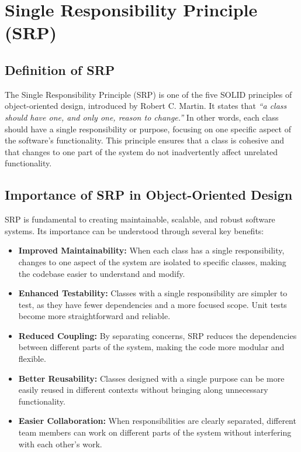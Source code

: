 
\section{Single Responsibility Principle (SRP)}

\subsection{Definition of SRP}

The Single Responsibility Principle (SRP) is one of the five SOLID principles of object-oriented design, introduced by Robert C. Martin. It states that \textit{``a class should have one, and only one, reason to change.''} In other words, each class should have a single responsibility or purpose, focusing on one specific aspect of the software's functionality. This principle ensures that a class is cohesive and that changes to one part of the system do not inadvertently affect unrelated functionality.

\subsection{Importance of SRP in Object-Oriented Design}

SRP is fundamental to creating maintainable, scalable, and robust software systems. Its importance can be understood through several key benefits:

\begin{itemize}
    \item \textbf{Improved Maintainability:} When each class has a single responsibility, changes to one aspect of the system are isolated to specific classes, making the codebase easier to understand and modify.
    
    \item \textbf{Enhanced Testability:} Classes with a single responsibility are simpler to test, as they have fewer dependencies and a more focused scope. Unit tests become more straightforward and reliable.
    
    \item \textbf{Reduced Coupling:} By separating concerns, SRP reduces the dependencies between different parts of the system, making the code more modular and flexible.
    
    \item \textbf{Better Reusability:} Classes designed with a single purpose can be more easily reused in different contexts without bringing along unnecessary functionality.
    
    \item \textbf{Easier Collaboration:} When responsibilities are clearly separated, different team members can work on different parts of the system without interfering with each other's work.
\end{itemize}

